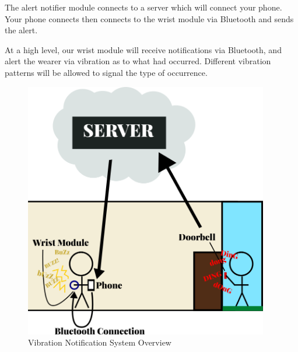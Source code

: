 The alert notifier module connects to a server which will connect your phone. Your phone connects then connects to the wrist module via Bluetooth and sends the alert.

At a high level, our wrist module will receive notifications via Bluetooth, and alert the wearer via vibration as to what had occurred. Different vibration patterns will be allowed to signal the type of occurrence.
\newline
\begin{figure}[h!]
	\centering
   	\includegraphics[width=0.95\textwidth]{images/high-level-system-overview.png}
   	\caption{Vibration Notification System Overview}
\end{figure}